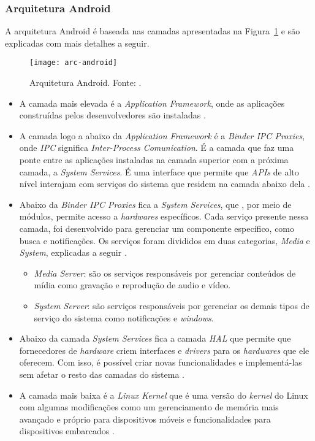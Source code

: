 \subsubsection{Arquitetura Android} \label{subsection:arc-android}

A arquitetura Android é baseada nas camadas apresentadas na Figura~\ref{fig:arc-android} e são explicadas com mais detalhes a seguir.

\begin{figure}[H]
	\centering
	\texttt{[image: arc-android]}
	\caption[Arquitetura Android]{ Arquitetura Android. Fonte: \cite{android_android_2016}.}
	\label{fig:arc-android}
\end{figure}

\begin{itemize}

    \item A camada mais elevada é a \textit{Application Framework}, onde as aplicações construídas pelos desenvolvedores são instaladas \cite{android_android_2016}.
    \item A camada logo a abaixo da \textit{Application Framework} é a \textit{Binder IPC Proxies}, onde \textit{IPC} significa \textit{Inter-Process Comunication}.
    É a camada que faz uma ponte entre as aplicações instaladas na camada superior com a próxima camada, a \textit{System Services}. É uma interface que permite que \textit{APIs}
    de alto nível interajam com serviços do sistema que residem na camada abaixo dela \cite{android_android_2016}. 
    \item Abaixo da \textit{Binder IPC Proxies} fica a \textit{System Services}, que , por meio de módulos, permite acesso a \textit{hardwares} específicos. Cada serviço presente nessa camada,
    foi desenvolvido para gerenciar um componente específico, como busca e notificações. Os serviços foram divididos em duas categorias, \textit{Media} e \textit{System}, explicadas a seguir \cite{android_android_2016}.
    \begin{itemize}
        \item \textit{Media Server}: são os serviços responsáveis por gerenciar conteúdos de mídia como gravação e reprodução de audio e vídeo. 
        \item \textit{System Server}: são serviços responsáveis por gerenciar os demais tipos de serviço do sistema como notificações e \textit{windows}.
    \end{itemize}
    \item Abaixo da camada \textit{System Services} fica a camada \textit{HAL} que permite que fornecedores de \textit{hardware} criem interfaces e \textit{drivers} para os \textit{hardwares} que
    ele oferecem. Com isso, é possível criar novas funcionalidades e implementá-las sem afetar o resto das camadas do sistema \cite{android_android_2016}.  
    \item A camada mais baixa é a \textit{Linux Kernel} que é uma versão do \textit{kernel} do Linux com algumas modificações como um gerenciamento de memória mais avançado e próprio para dispositivos 
    móveis e funcionalidades para dispositivos embarcados \cite{android_android_2016}. 
    

\end{itemize}
